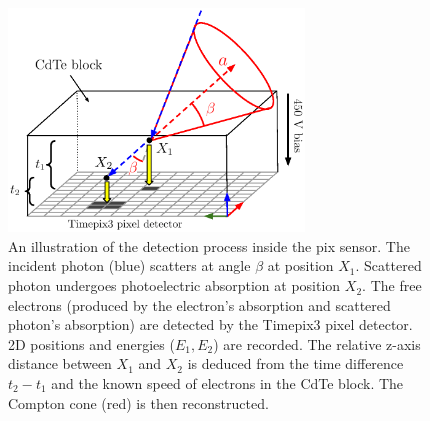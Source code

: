 \begin{figure}[!h]
    \centering
  \includegraphics[width=0.7\textwidth]{./fig/photos/my_minipix.eps}
    \caption{An illustration of the detection process inside the \ac{pix} sensor. 
    The incident photon (blue) scatters at angle $\beta$ at position $X_{1}$. 
    Scattered photon undergoes photoelectric absorption at position $X_{2}$. 
    The free electrons (produced by the electron's absorption and scattered photon's absorption) are detected by the Timepix3 pixel detector. 2D positions and energies ($E_{1}, E_{2}$) are recorded. 
    The relative z-axis distance between $X_{1}$ and $X_{2}$ is deduced from the time difference $t_{2}-t_{1}$ and the known speed of electrons in the \ac{CdTe} block.
    The Compton cone (red) is then reconstructed.}
    \label{fig:minipix}
\end{figure}

